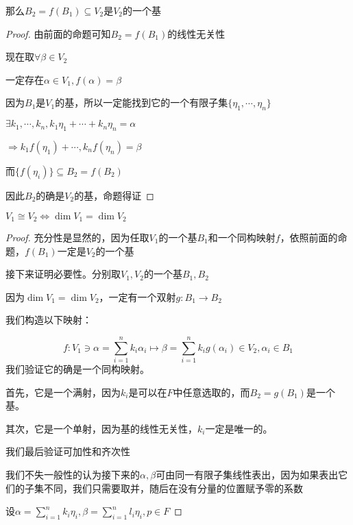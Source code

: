 \documentclass[12pt, a4paper, oneside, UTF8]{ctexbook}
\begin{document}
\begin{para}{0}
\begin{proposition}
						那么$B_2 = f(B_1) \subseteq V_2$是$V_2$的一个基
					\end{proposition}
					\begin{proof}
						由前面的命题可知$B_2=f(B_1)$的线性无关性

						现在取$\forall \beta \in V_2$

						一定存在$\alpha \in V_1,f(\alpha )=\beta $

						因为$B_1$是$V_1$的基，所以一定能找到它的一个有限子集$\{\eta_1,\cdots,\eta_n\}$

						$\exists k_1,\cdots,k_n ,k_1 \eta_1 +\cdots + k_n \eta_n = \alpha $

						$\Rightarrow k_1 f(\eta_1) + \cdots, k_n f(\eta_n) = \beta $

						而$\{f(\eta_i)\} \subseteq B_2 = f(B_2)$

						因此$B_2$的确是$V_2$的基，命题得证
					\end{proof}
				\point{}
					\begin{proposition}
						$V_1 \cong V_2 \Leftrightarrow \dim V_1  = \dim V_2$
					\end{proposition}
					\begin{proof}
						充分性是显然的，因为任取$V_1$的一个基$B_1$和一个同构映射$f$，依照前面的命题，$f(B_1)$一定是$V_2$的一个基

						接下来证明必要性。分别取$V_1,V_2$的一个基$B_1,B_2$

						因为$\dim V_1 = \dim V_2$，一定有一个双射$g:B_1 \to B_2$

						我们构造以下映射：

						\begin{equation}
							f: V_1 \ni \alpha = \sum\limits_{i=1}^{n} k_i \alpha_i \mapsto \beta = \sum\limits_{i=1}^{n} k_i g(\alpha_i) \in V_2,\alpha_i \in B_1
						\end{equation}
						我们验证它的确是一个同构映射。

						首先，它是一个满射，因为$k_i$是可以在$F$中任意选取的，而$B_2=g(B_1)$是一个基。

						其次，它是一个单射，因为基的线性无关性，$k_i$一定是唯一的。

						我们最后验证可加性和齐次性

						我们不失一般性的认为接下来的$\alpha ,\beta $可由同一有限子集线性表出，因为如果表出它们的子集不同，我们只需要取并，随后在没有分量的位置赋予零的系数

						设$\alpha =\sum\limits_{i=1}^{n} k_i \eta_i ,\beta =\sum\limits_{i=1}^{n} l_i \eta_i,p \in F$


\end{proof}
\end{para}
\end{document}
